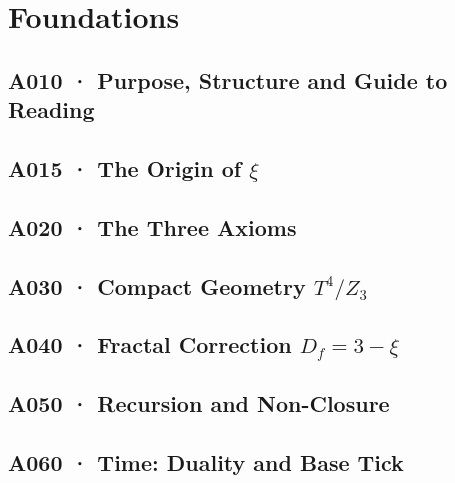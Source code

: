 \documentclass[11pt,twoside,openright]{book}
\begin{document}
\tableofcontents
\clearpage

\part{Foundations}

\chapter[A010 · Purpose and Structure]{A010 · Purpose, Structure and Guide to Reading}


\chapter[A015 · The Origin of $\xi$]{A015 · The Origin of $\xi$}


\chapter[A020 · The Three Axioms]{A020 · The Three Axioms}


\chapter[A030 · Compact Geometry $T^4/Z_3$]{A030 · Compact Geometry $T^4/Z_3$}


\chapter[A040 · Fractal Correction]{A040 · Fractal Correction $D_f = 3{-}\xi$}


\chapter[A050 · Recursion and Non-Closure]{A050 · Recursion and Non-Closure}


\chapter[A060 · Time: Duality and Base Tick]{A060 · Time: Duality and Base Tick}

\end{document}
